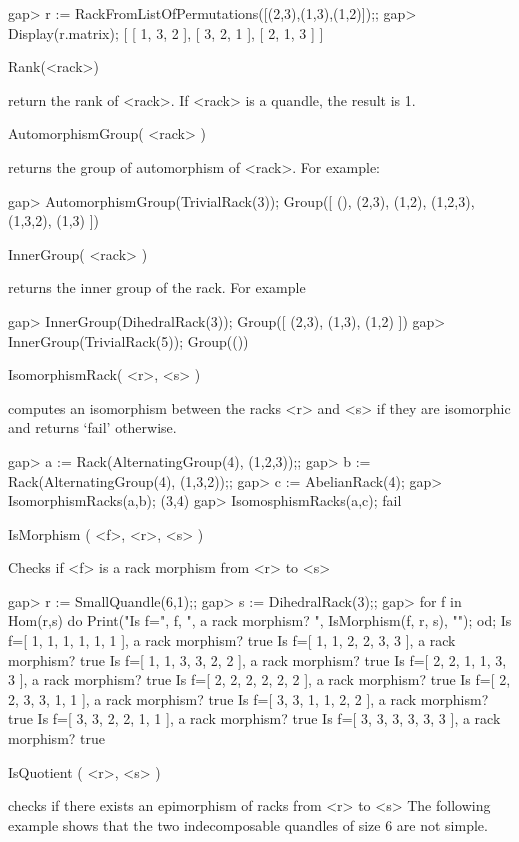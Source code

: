\beginexample
gap> r := RackFromListOfPermutations([(2,3),(1,3),(1,2)]);;
gap> Display(r.matrix);
[ [  1,  3,  2 ],
  [  3,  2,  1 ],
  [  2,  1,  3 ] ]
\endexample

\>Rank(<rack>)

return the rank of <rack>. If <rack> is a quandle, the result is 1.

\>AutomorphismGroup( <rack> )

returns the group of automorphism of <rack>. For example:

\beginexample
gap> AutomorphismGroup(TrivialRack(3));                  
Group([ (), (2,3), (1,2), (1,2,3), (1,3,2), (1,3) ])
\endexample

\>InnerGroup( <rack> )

returns the inner group of the rack. For example

\beginexample
gap> InnerGroup(DihedralRack(3));
Group([ (2,3), (1,3), (1,2) ])
gap> InnerGroup(TrivialRack(5)); 
Group(())
\endexample

\>IsomorphismRack( <r>, <s> )

computes  an  isomorphism  between  the  racks  <r>  and  <s> if they are
isomorphic and returns `fail' otherwise.

\beginexample
gap> a := Rack(AlternatingGroup(4), (1,2,3));;
gap> b := Rack(AlternatingGroup(4), (1,3,2));;
gap> c := AbelianRack(4);
gap> IsomorphismRacks(a,b);
(3,4)
gap> IsomosphismRacks(a,c);
fail
\endexample

\>IsMorphism ( <f>, <r>, <s> )

Checks if <f> is a rack morphism from <r> to <s>

\beginexample
gap> r := SmallQuandle(6,1);;
gap> s := DihedralRack(3);;
gap> for f in Hom(r,s) do Print("Is f=", f, ", a rack morphism? ", IsMorphism(f, r, s), "\n"); od;
Is f=[ 1, 1, 1, 1, 1, 1 ], a rack morphism? true
Is f=[ 1, 1, 2, 2, 3, 3 ], a rack morphism? true
Is f=[ 1, 1, 3, 3, 2, 2 ], a rack morphism? true
Is f=[ 2, 2, 1, 1, 3, 3 ], a rack morphism? true
Is f=[ 2, 2, 2, 2, 2, 2 ], a rack morphism? true
Is f=[ 2, 2, 3, 3, 1, 1 ], a rack morphism? true
Is f=[ 3, 3, 1, 1, 2, 2 ], a rack morphism? true
Is f=[ 3, 3, 2, 2, 1, 1 ], a rack morphism? true
Is f=[ 3, 3, 3, 3, 3, 3 ], a rack morphism? true
\endexample

\>IsQuotient ( <r>, <s> )

checks if there exists an epimorphism of racks from <r> to <s> The following
example shows that the two indecomposable quandles of size 6 are not simple.

